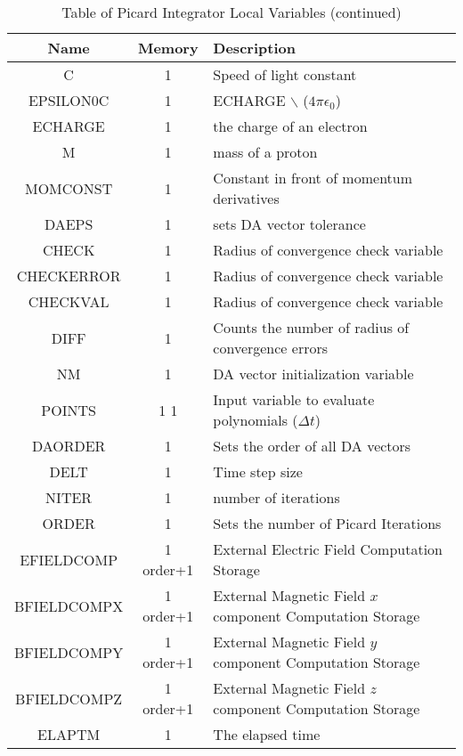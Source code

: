 \documentclass[oneside,12pt]{book}
\begin{document}
\begin{center}
\begin{table}[ht]
\begin{tabular}{|c|c|p{4in}|}
\hline
\textbf{Name} & \textbf{Memory} & \textbf{Description}\\
\hline
C & 1 & Speed of light constant\\
\hline
EPSILON0C & 1 & ECHARGE $\backslash$ ($4 \pi \epsilon_0$)\\
\hline
ECHARGE & 1 & the charge of an electron\\
\hline
M & 1 & mass of a proton\\
\hline
MOMCONST & 1 & Constant in front of momentum derivatives\\
\hline
DAEPS & 1 & sets DA vector tolerance\\
\hline
CHECK & 1 & Radius of convergence check variable\\
\hline
CHECKERROR & 1 & Radius of convergence check variable\\
\hline
CHECKVAL & 1 & Radius of convergence check variable\\
\hline
DIFF & 1 & Counts the number of radius of convergence errors\\
\hline
NM & 1 & DA vector initialization variable\\
\hline
POINTS & 1 1 & Input variable to evaluate polynomials ($\Delta t$)\\
\hline
DAORDER & 1 & Sets the order of all DA vectors\\
\hline
DELT & 1 & Time step size\\
\hline
NITER & 1 & number of iterations\\
\hline
ORDER & 1 & Sets the number of Picard Iterations\\
\hline
EFIELDCOMP & 1 order+1 & External Electric Field Computation Storage\\
\hline
BFIELDCOMPX & 1 order+1 & External Magnetic Field $x$ component Computation Storage\\
\hline
BFIELDCOMPY & 1 order+1 & External Magnetic Field $y$ component Computation Storage\\
\hline
BFIELDCOMPZ & 1 order+1 & External Magnetic Field $z$ component Computation Storage\\
\hline
ELAPTM & 1 & The elapsed time\\
\hline
\end{tabular}
\caption{Table of Picard Integrator Local Variables (continued)}
\end{table}
\end{center}
\end{document}
